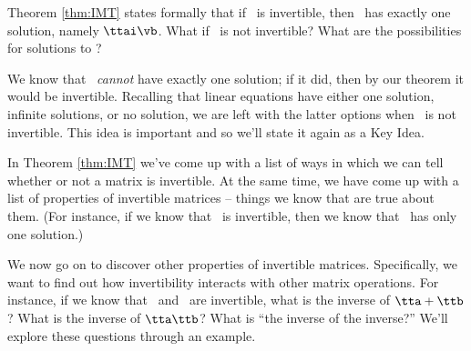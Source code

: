 Theorem \ref{thm:IMT} states formally that if \tta\ is invertible, then \ttaxb\ has exactly one solution, namely $\ttai\vb$. What if \tta\ is not invertible? What are the possibilities for solutions to \ttaxb? 

We know that \ttaxb\ \textit{cannot} have exactly one solution; if it did, then by our theorem it would be invertible. Recalling that linear equations have either one solution, infinite solutions, or no solution, we are left with the latter options when \tta\ is not invertible. This idea is important and so we'll state it again as a Key Idea.

\smallskip


\smallskip

In Theorem \ref{thm:IMT} we've come up with a list of ways in which we can tell whether or not a matrix is invertible. At the same time, we have come up with a list of properties of invertible matrices -- things we know that are true about them. (For instance, if we know that \tta\ is invertible, then we know that \ttaxb\ has only one solution.) 

We now go on to discover other properties of invertible matrices. Specifically, we want to find out how invertibility interacts with other matrix operations. For instance, if we know that \tta\ and \ttb\ are invertible, what is the inverse of $\tta+\ttb$? What is the inverse of $\tta\ttb$? What is ``the inverse of the inverse?'' We'll explore these questions through an example.\\


